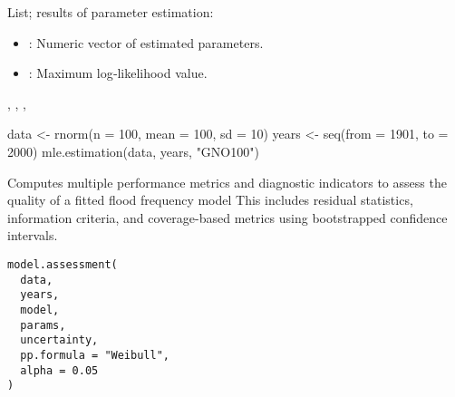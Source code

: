 \documentclass[a4paper]{book}
\begin{document}
%
\begin{Value}
List; results of parameter estimation:
\begin{itemize}

\item{} : Numeric vector of estimated parameters.
\item{} : Maximum log‐likelihood value.

\end{itemize}

\end{Value}
%
\begin{SeeAlso}
, , , 
\end{SeeAlso}
%
\begin{Examples}
\begin{ExampleCode}
data <- rnorm(n = 100, mean = 100, sd = 10)
years <- seq(from = 1901, to = 2000)
mle.estimation(data, years, "GNO100")

\end{ExampleCode}
\end{Examples}
%
\begin{Description}
Computes multiple performance metrics and diagnostic indicators to assess the quality of
a fitted flood frequency model This includes residual statistics, information criteria,
and coverage-based metrics using bootstrapped confidence intervals.
\end{Description}
%
\begin{Usage}
\begin{verbatim}
model.assessment(
  data,
  years,
  model,
  params,
  uncertainty,
  pp.formula = "Weibull",
  alpha = 0.05
)
\end{verbatim}
\end{Usage}
%
\end{document}
